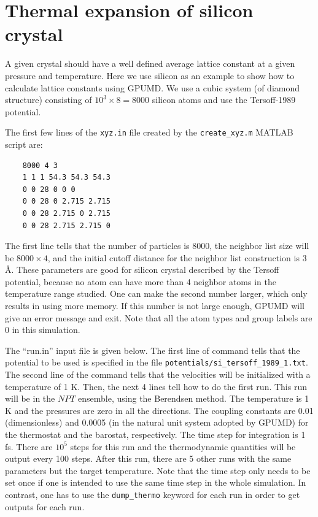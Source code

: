 \documentclass[12pt,a4paper]{report}
\begin{document}
\section{Thermal expansion of silicon crystal}


A given crystal should have a well defined average lattice constant at a given pressure and temperature. Here we use silicon as an example to show how to calculate lattice constants using GPUMD. We use a cubic system (of diamond structure) consisting of $10^3\times 8 = 8000$ silicon atoms and use the Tersoff-1989 potential.

The first few lines of the \verb"xyz.in" file created by the \verb"create_xyz.m" MATLAB script are:
\begin{verbatim}
    8000 4 3
    1 1 1 54.3 54.3 54.3
    0 0 28 0 0 0
    0 0 28 0 2.715 2.715
    0 0 28 2.715 0 2.715
    0 0 28 2.715 2.715 0
\end{verbatim}
The first line tells that the number of particles is 8000, the neighbor list size will be
$8000\times 4$, and the initial cutoff distance for the neighbor list construction is 3 \AA.
These parameters are good for silicon crystal described by the Tersoff potential, because no atom can have more than 4 neighbor atoms in the temperature range studied. One can make the second number larger, which only results in using more memory. If this number is not large enough, GPUMD will give an error message and exit. Note that all the atom types and group labels are 0 in this simulation.

The ``run.in'' input file is given below. The first line of command tells that the potential to be used is specified in the file \verb"potentials/si_tersoff_1989_1.txt".  The second line of the command tells that the velocities will be initialized with a temperature of 1 K. Then, the next 4 lines tell how to do the first run. This run will be in the $NPT$ ensemble, using the Berendsen method. The temperature is 1 K and the pressures are zero in all the directions. The coupling constants are 0.01 (dimensionless) and 0.0005 (in the natural unit system adopted by GPUMD) for the thermostat and the barostat, respectively. The time step for integration is 1 fs. There are $10^5$ steps for this run and the thermodynamic quantities will be output every 100 steps. After this run, there are 5 other runs with the same parameters but the target temperature. Note that the time step only needs to be set once if one is intended to use the same time step in the whole simulation. In contrast, one has to use the \verb"dump_thermo" keyword for each run in order to get outputs for each run.
\end{document}
